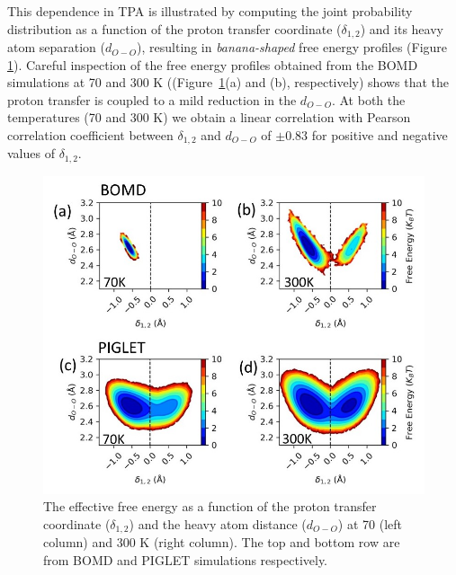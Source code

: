 This dependence in TPA is illustrated by computing the joint probability
distribution as a function of the proton
transfer coordinate ($\delta_{1,2}$) and its heavy atom separation ($d_{O-O}$), resulting in \emph{banana-shaped} free energy profiles
(Figure \ref{fig:delta_OO}). Careful inspection of the free
energy profiles obtained from the BOMD simulations at 70 and 300 K
((Figure~\ref{fig:delta_OO}(a) and (b), respectively) shows that the proton transfer is coupled to a mild reduction in the $d_{O-O}$.
At both the temperatures (70 and 300 K) we obtain a linear correlation with Pearson correlation coefficient between $\delta_{1,2}$ and
$d_{O-O}$ of $\pm 0.83$ for positive and negative
values of $\delta_{1,2}$. 


\begin{figure}
\centering
\includegraphics[width=16cm ]{./Chapter1/new_figures/prob_delta_OO.jpg} 
\caption{The effective free energy as a function of the proton transfer
coordinate ($\delta_{1,2}$) and the heavy atom distance ($d_{O-O}$) at
70 (left column) and 300 K (right column). The top and bottom row are
from BOMD and PIGLET simulations respectively.}
\label{fig:delta_OO}
\end{figure}

